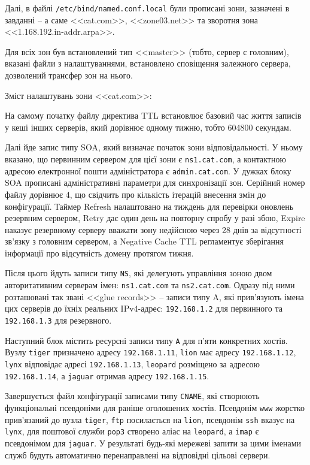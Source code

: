 \documentclass[14pt, a4paper]{extreport}
\begin{document}
	Далі, в файлі \texttt{/etc/bind/named.conf.local} були прописані зони, зазначені в завданні -- а саме <<cat.com>>, <<zone03.net>> та зворотня зона <<1.168.192.in-addr.arpa>>.
	
	Для всіх зон був встановлений тип <<master>> (тобто, сервер є головним), вказані файли з налаштуваннями, встановлено сповіщення залежного сервера, дозволений трансфер зон на нього.
	
	
	Зміст налаштувань зони <<cat.com>>:
	
	
	На самому початку файлу директива TTL встановлює базовий час життя записів у кеші інших серверів, який дорівнює одному тижню, тобто 604800 секундам.
	
	Далі йде запис типу SOA, який визначає початок зони відповідальності. У ньому вказано, що первинним сервером для цієї зони є \texttt{ns1.cat.com}, а контактною адресою електронної пошти адміністратора є \texttt{admin.cat.com}. У дужках блоку SOA прописані адміністративні параметри для синхронізації зон. Серійний номер файлу дорівнює 4, що свідчить про кількість ітерацій внесення змін до конфігурації. Таймер Refresh налаштовано на тиждень для перевірки оновлень резервним сервером, Retry дає один день на повторну спробу у разі збою, Expire наказує резервному серверу вважати зону недійсною через 28 днів за відсутності зв'язку з головним сервером, а Negative Cache TTL регламентує зберігання інформації про відсутність домену протягом тижня.
	
	Після цього йдуть записи типу \texttt{NS}, які делегують управління зоною двом авторитативним серверам імен: \texttt{ns1.cat.com} та \texttt{ns2.cat.com}. Одразу під ними розташовані так звані <<glue records>> -- записи типу A, які прив'язують імена цих серверів до їхніх реальних IPv4-адрес: \texttt{192.168.1.2} для первинного та \texttt{192.168.1.3} для резервного.
	
	Наступний блок містить ресурсні записи типу \texttt{A} для п'яти конкретних хостів. Вузлу \texttt{tiger} призначено адресу \texttt{192.168.1.11}, \texttt{lion} має адресу \texttt{192.168.1.12}, \texttt{lynx} відповідає адресі \texttt{192.168.1.13}, \texttt{leopard} розміщено за адресою \texttt{192.168.1.14}, а \texttt{jaguar} отримав адресу \texttt{192.168.1.15}.
	
	Завершується файл конфігурації записами типу \texttt{CNAME}, які створюють функціональні псевдоніми для раніше оголошених хостів. Псевдонім \texttt{www} жорстко прив'язаний до вузла \texttt{tiger}, \texttt{ftp} посилається на \texttt{lion}, псевдонім \texttt{ssh} вказує на \texttt{lynx}, для поштової служби \texttt{pop3} створено аліас на \texttt{leopard}, а \texttt{imap} є псевдонімом для \texttt{jaguar}. У результаті будь-які мережеві запити за цими іменами служб будуть автоматично перенаправлені на відповідні цільові сервери.
	
\end{document}
